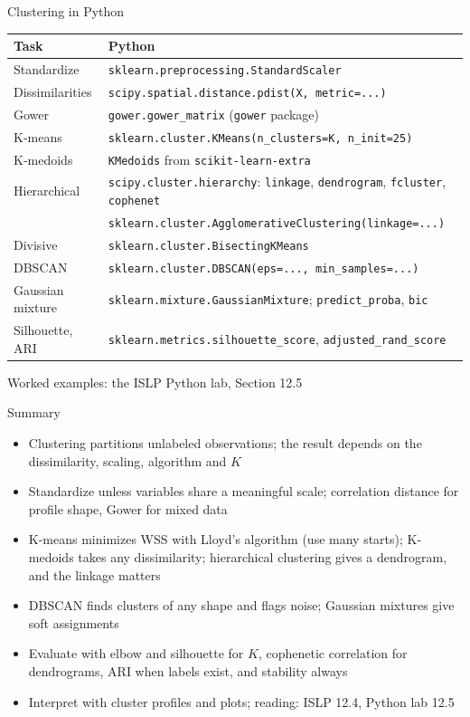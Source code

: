 \begin{frame}{Clustering in Python}
    \centering
    \scriptsize
    \begin{tabular}{@{}l l@{}}
        \toprule
        Task & Python \\
        \midrule
        Standardize & \texttt{sklearn.preprocessing.StandardScaler} \\
        Dissimilarities & \texttt{scipy.spatial.distance.pdist(X, metric=...)} \\
        Gower & \texttt{gower.gower\_matrix} (\texttt{gower} package) \\
        K-means & \texttt{sklearn.cluster.KMeans(n\_clusters=K, n\_init=25)} \\
        K-medoids & \texttt{KMedoids} from \texttt{scikit-learn-extra} \\
        Hierarchical & \texttt{scipy.cluster.hierarchy}: \texttt{linkage}, \texttt{dendrogram}, \texttt{fcluster}, \texttt{cophenet} \\
         & \texttt{sklearn.cluster.AgglomerativeClustering(linkage=...)} \\
        Divisive & \texttt{sklearn.cluster.BisectingKMeans} \\
        DBSCAN & \texttt{sklearn.cluster.DBSCAN(eps=..., min\_samples=...)} \\
        Gaussian mixture & \texttt{sklearn.mixture.GaussianMixture}; \texttt{predict\_proba}, \texttt{bic} \\
        Silhouette, ARI & \texttt{sklearn.metrics.silhouette\_score}, \texttt{adjusted\_rand\_score} \\
        \bottomrule
    \end{tabular}

    \svspace{0.5em}
    Worked examples: the ISLP Python lab, Section 12.5
\end{frame}

\begin{frame}{Summary}
    \begin{itemize}
        \item Clustering partitions unlabeled observations; the result depends on the dissimilarity, scaling, algorithm and $K$
        \item Standardize unless variables share a meaningful scale; correlation distance for profile shape, Gower for mixed data
        \item K-means minimizes WSS with Lloyd's algorithm (use many starts); K-medoids takes any dissimilarity; hierarchical clustering gives a dendrogram, and the linkage matters
        \item DBSCAN finds clusters of any shape and flags noise; Gaussian mixtures give soft assignments
        \item Evaluate with elbow and silhouette for $K$, cophenetic correlation for dendrograms, ARI when labels exist, and stability always
        \item Interpret with cluster profiles and plots; reading: ISLP 12.4, Python lab 12.5
    \end{itemize}
\end{frame}
